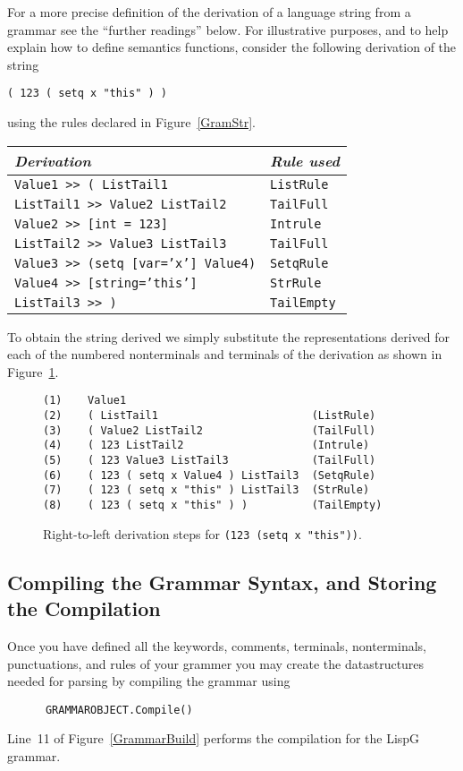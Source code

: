 For a more precise definition of the derivation of a
language string from a grammar see the ``further readings''
below.  For illustrative purposes, and to help explain
how to define semantics functions, consider the following
derivation of the string
\begin{center}
{\tt ( 123 ( setq x "this" ) )}
\end{center}
using the rules declared in Figure~\ref{GramStr}.
\begin{center}
\begin{tabular}{l|l}
{\em Derivation} & {\em Rule used} \\ \hline
{\tt Value1 >> ( ListTail1} & {\tt ListRule} \\
{\tt ListTail1 >> Value2 ListTail2} & {\tt TailFull} \\
{\tt Value2 >> [int = 123]} & {\tt Intrule} \\
{\tt ListTail2 >> Value3 ListTail3} & {\tt TailFull} \\
{\tt Value3 >> (setq [var='x'] Value4)} & {\tt SetqRule} \\
{\tt Value4 >> [string='this']} & {\tt StrRule} \\
{\tt ListTail3 >> )} & {\tt TailEmpty}
\end{tabular}
\end{center}
To obtain the string derived we simply substitute the
representations derived for each of the numbered nonterminals
and terminals of the derivation as shown
in Figure~\ref{Derive}.
\begin{figure}
\begin{verbatim}
(1)    Value1 
(2)    ( ListTail1                        (ListRule)
(3)    ( Value2 ListTail2                 (TailFull)
(4)    ( 123 ListTail2                    (Intrule)
(5)    ( 123 Value3 ListTail3             (TailFull)
(6)    ( 123 ( setq x Value4 ) ListTail3  (SetqRule)
(7)    ( 123 ( setq x "this" ) ListTail3  (StrRule)
(8)    ( 123 ( setq x "this" ) )          (TailEmpty)
\end{verbatim}
\caption{Right-to-left derivation steps for {\tt (123 (setq x "this"))}.
         \label{Derive}}
\end{figure}

\subsection{Compiling the Grammar Syntax, and Storing the Compilation}

Once you have defined all the keywords, comments, terminals,
nonterminals, punctuations, and rules of your grammer you
may create the datastructures needed for parsing by
compiling the grammar using
\begin{verbatim}
      GRAMMAROBJECT.Compile()
\end{verbatim}
Line~11 of Figure~\ref{GrammarBuild} performs the compilation
for the LispG grammar.


